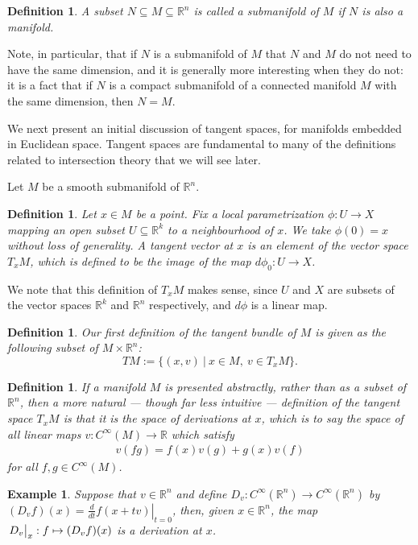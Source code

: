 \documentclass{amsart}          %
\newtheorem{definition}[theorem]{Definition}
\newtheorem{example}[theorem]{Example}
\newcommand{\R}{\mathbb R}
\newcommand{\diff}[2]{\frac{d #1}{d #2}}
\begin{document}
\begin{definition}
	A subset $N\subseteq M\subseteq \R^n$ is called a submanifold of $M$ if $N$ is also a manifold.
\end{definition}

Note, in particular, that if $N$ is a submanifold of $M$ that $N$ and $M$ do not need to have the same dimension, and it is generally more interesting when they do not: it is a fact that if $N$ is a compact submanifold of a connected manifold $M$ with the same dimension, then $N=M$. 

We next present an initial discussion of tangent spaces, for manifolds embedded in Euclidean space. Tangent spaces are fundamental to many of the definitions related to intersection theory that we will see later.

Let $M$ be a smooth submanifold of $\R^n$. 
\begin{definition}
Let $x\in M$ be a point. Fix a local parametrization $\phi:U\to X$ mapping an open subset $U\subseteq\R^k$ to a neighbourhood of $x$. We take $\phi(0)=x$ without loss of generality. A \emph{tangent vector at $x$} is an element of the vector space $T_x M$, which is defined to be the image of the map $d\phi_0:U\to X$.
\end{definition}
We note that this definition of $T_xM$ makes sense, since $U$ and $X$ are subsets of the vector spaces $\R^k$ and $\R^n$ respectively, and $d\phi$ is a linear map.
\begin{definition}
Our first definition of \emph{the tangent bundle of $M$} is given as the following subset of $M\times\R^n$:
\[
TM:=
\{
(x,v)~|~x\in M,~v\in T_x M
\}.
\]
\end{definition}
\begin{definition}
	If a manifold $M$ is presented abstractly, rather than as a subset of $\R^n$, then a more natural --- though far less intuitive --- definition of the tangent space $T_xM$ is that it is the \textit{space of derivations at $x$}, which is to say the space of all linear maps $v:C^\infty(M)\to\R$ which satisfy\begin{align*}
	v(fg)=f(x)v(g)+g(x)v(f)
	\end{align*}for all $f,g\in C^\infty(M)$.
\end{definition}
\begin{example}
	Suppose that $v\in\R^n$ and define $D_v:C^\infty(\R^n)\to C^\infty(\R^n)$ by $(D_vf)(x)=\left.\diff{}{t}f(x+tv)\right|_{t=0}$, then, given $x\in\R^n$, the map $\left.D_v\vphantom{\diff{}{x}}\right|_x:f\mapsto (D_vf)(x)$ is a derivation at $x$.
\end{example}
\end{document}
